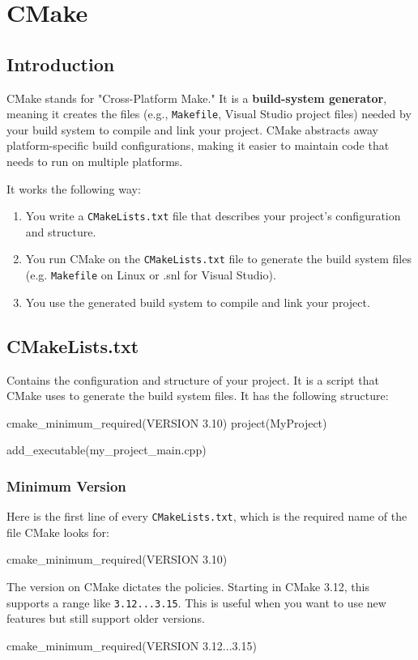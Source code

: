 \section{CMake}

\subsection*{Introduction}

CMake stands for "Cross-Platform Make." It is a \textbf{build-system generator}, meaning it creates the files (e.g., \texttt{Makefile}, Visual Studio project files) needed by your build system to compile and link your project.
CMake abstracts away platform-specific build configurations, making it easier to maintain code that needs to run on multiple platforms.

It works the following way:
\begin{enumerate}
    \item You write a \texttt{CMakeLists.txt} file that describes your project's configuration and structure.
    \item You run CMake on the \texttt{CMakeLists.txt} file to generate the build system files (e.g. \texttt{Makefile} on Linux or .snl for Visual Studio).
    \item You use the generated build system to compile and link your project.
\end{enumerate}

\subsection*{CMakeLists.txt}

Contains the configuration and structure of your project. It is a script that CMake uses to generate the build system files.
It has the following structure:

\begin{codeblock}[language=C++]
cmake_minimum_required(VERSION 3.10) 
project(MyProject)  

add_executable(my_project_main.cpp) 
\end{codeblock}

\subsubsection{Minimum Version}

Here is the first line of every \texttt{CMakeLists.txt}, which is the required name of the file CMake looks for:
\begin{codeblock}[language=bash]
cmake_minimum_required(VERSION 3.10)
\end{codeblock}
The version on CMake dictates the policies. Starting in CMake 3.12, this supports
a range like \texttt{3.12...3.15}. This is useful when you want to use new features but still support older versions.
\begin{codeblock}[language=bash]
cmake_minimum_required(VERSION 3.12...3.15)
\end{codeblock}

